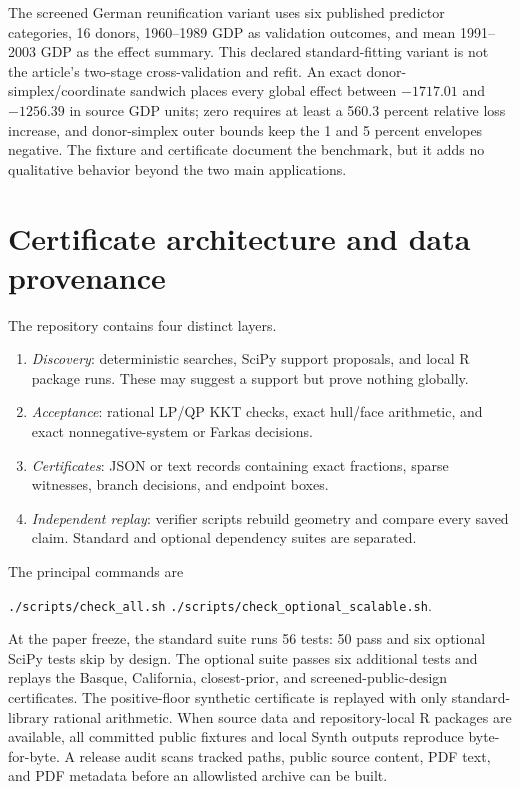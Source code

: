 \documentclass[10pt]{article}
\theoremstyle{definition}
\newcommand{\code}[1]{\texttt{#1}}
\begin{document}
The screened German reunification variant uses six published predictor
categories, 16 donors, 1960--1989 GDP as validation outcomes, and mean
1991--2003 GDP as the effect summary.  This declared standard-fitting variant
is not the article's two-stage cross-validation and refit.  An exact
donor-simplex/coordinate sandwich places every global effect between
$-1717.01$ and $-1256.39$ in source GDP units; zero requires at least a 560.3
percent relative loss increase, and donor-simplex outer bounds keep the 1 and
5 percent envelopes negative. The fixture and certificate document the
benchmark, but it
adds no qualitative behavior beyond the two main applications.

\section{Certificate architecture and data provenance}

The repository contains four distinct layers.

\begin{enumerate}
\item \emph{Discovery}: deterministic searches, SciPy support proposals, and
local R package runs.  These may suggest a support but prove nothing globally.
\item \emph{Acceptance}: rational LP/QP KKT checks, exact hull/face arithmetic,
and exact nonnegative-system or Farkas decisions.
\item \emph{Certificates}: JSON or text records containing exact fractions,
sparse witnesses, branch decisions, and endpoint boxes.
\item \emph{Independent replay}: verifier scripts rebuild geometry and compare
every saved claim.  Standard and optional dependency suites are separated.
\end{enumerate}

The principal commands are
\begin{center}
\code{./scripts/check\_all.sh}\qquad
\code{./scripts/check\_optional\_scalable.sh}.
\end{center}
At the paper freeze, the standard suite runs 56 tests: 50 pass and six optional
SciPy tests skip by design.  The optional suite passes six additional tests and
replays the Basque, California, closest-prior, and screened-public-design
certificates.  The positive-floor synthetic certificate is replayed with only
standard-library rational arithmetic.  When source data and repository-local R
packages are available, all committed public fixtures and local
\textsf{Synth} outputs reproduce byte-for-byte.  A release audit scans tracked
paths, public source content, PDF text, and PDF metadata before an allowlisted
archive can be built.
\end{document}
